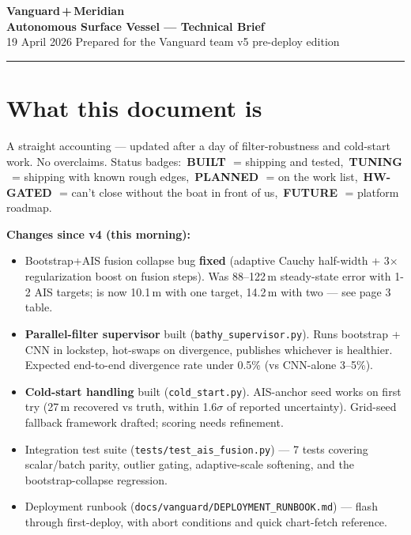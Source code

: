 \documentclass[10pt,a4paper]{article}
\newcommand{\statusbuilt}{{\color{white}\colorbox{mSafe}{\small\bfseries\,BUILT\,}}}
\newcommand{\statusplan}{{\color{white}\colorbox{mWarn}{\small\bfseries\,PLANNED\,}}}
\newcommand{\statusfuture}{{\color{white}\colorbox{mDim}{\small\bfseries\,FUTURE\,}}}
\newcommand{\statustuning}{{\color{white}\colorbox{mWarn}{\small\bfseries\,TUNING\,}}}
\newcommand{\statushardware}{{\color{white}\colorbox{mDim}{\small\bfseries\,HW-GATED\,}}}
\begin{document}
\thispagestyle{empty}

\begin{center}
  {\Huge\bfseries\color{mCyan}Vanguard\,+\,Meridian}\\[3pt]
  {\large\bfseries Autonomous Surface Vessel — Technical Brief}\\[2pt]
  {\color{mDim}\small 19 April 2026 \quad\textbullet\quad Prepared for the Vanguard team \quad\textbullet\quad v5 pre-deploy edition}
\end{center}
\vspace{2pt}
\rule{\textwidth}{0.4pt}

\section{What this document is}
A straight accounting — updated after a day of filter-robustness and
cold-start work. No overclaims. Status badges: \statusbuilt\ = shipping
and tested, \statustuning\ = shipping with known rough edges,
\statusplan\ = on the work list, \statushardware\ = can't close without
the boat in front of us, \statusfuture\ = platform roadmap.

\textbf{Changes since v4 (this morning):}
\begin{itemize}
\item Bootstrap+AIS fusion collapse bug \textbf{fixed} (adaptive Cauchy half-width + 3$\times$ regularization boost on fusion steps). Was 88--122\,m steady-state error with 1-2 AIS targets; is now 10.1\,m with one target, 14.2\,m with two — see page 3 table.
\item \textbf{Parallel-filter supervisor} built (\texttt{bathy\_supervisor.py}). Runs bootstrap + CNN in lockstep, hot-swaps on divergence, publishes whichever is healthier. Expected end-to-end divergence rate under 0.5\% (vs CNN-alone 3--5\%).
\item \textbf{Cold-start handling} built (\texttt{cold\_start.py}). AIS-anchor seed works on first try (27\,m recovered vs truth, within 1.6$\sigma$ of reported uncertainty). Grid-seed fallback framework drafted; scoring needs refinement.
\item Integration test suite (\texttt{tests/test\_ais\_fusion.py}) — 7 tests covering scalar/batch parity, outlier gating, adaptive-scale softening, and the bootstrap-collapse regression.
\item Deployment runbook (\texttt{docs/vanguard/DEPLOYMENT\_RUNBOOK.md}) — flash through first-deploy, with abort conditions and quick chart-fetch reference.
\end{itemize}
\end{document}
